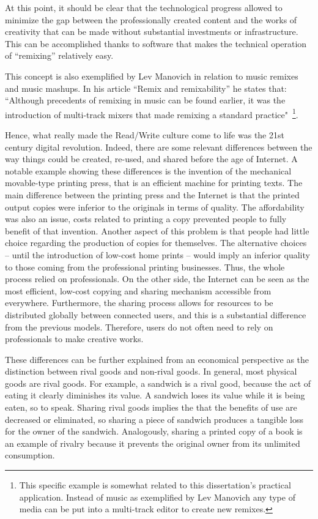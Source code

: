 At this point, it should be clear that the technological progress allowed to minimize the gap between the professionally created content and the works of creativity that can be made without substantial investments or infrastructure. This can be accomplished thanks to software that makes the technical operation of “remixing” relatively easy.

This concept is also exemplified by Lev Manovich in relation to music remixes and music mashups. In his article “Remix and remixability” he states that: “Although precedents of remixing in music can be found earlier, it was the introduction of multi-track mixers that made remixing a standard practice" \,\footnote{This specific example is somewhat related to this dissertation’s practical application. Instead of music as exemplified by Lev Manovich any type of media can be put into a multi-track editor to create new remixes.}.

Hence, what really made the Read/Write culture come to life was the 21st century digital revolution. Indeed, there are some relevant differences between the way things could be created, re-used, and shared before the age of Internet. A notable example showing these differences is the invention of the mechanical movable-type printing press, that is an efficient machine for printing texts. The main difference between the printing press and the Internet is that the printed output copies were inferior to the originals in terms of quality. The affordability was also an issue, costs related to printing a copy prevented people to fully benefit of that invention. Another aspect of this problem is that people had little choice regarding the production of copies for themselves. The alternative choices – until the introduction of low-cost home prints – would imply an inferior quality to those coming from the professional printing businesses. Thus, the whole process relied on professionals.
On the other side, the Internet can be seen as the most efficient, low-cost copying and sharing mechanism accessible from everywhere. Furthermore, the sharing process allows for resources to be distributed globally between connected users, and this is a substantial difference from the previous models. Therefore, users do not often need to rely on professionals to make creative works.

These differences can be further explained from an economical perspective as the distinction between rival goods and non-rival goods. In general, most physical goods are rival goods. For example, a sandwich is a rival good, because the act of eating it clearly diminishes its value. A sandwich loses its value while it is being eaten, so to speak. Sharing rival goods implies the that the benefits of use are decreased or eliminated, so sharing a piece of sandwich produces a tangible loss for the owner of the sandwich. Analogously, sharing a printed copy of a book is an example of rivalry because it prevents the original owner from its unlimited consumption.

